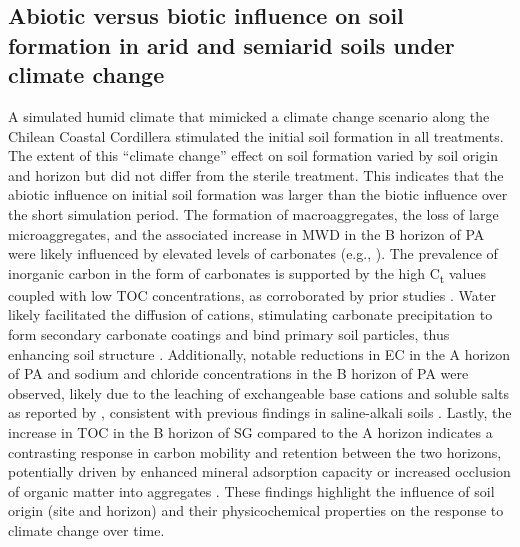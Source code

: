 \subsection{Abiotic versus biotic influence on soil formation in arid and semiarid soils under climate change}

A simulated humid climate that mimicked a climate change scenario along the Chilean Coastal Cordillera stimulated the initial soil formation in all treatments. The extent of this ``climate change'' effect on soil formation varied by soil origin and horizon but did not differ from the sterile treatment. This indicates that the abiotic influence on initial soil formation was larger than the biotic influence over the short simulation period. The formation of macroaggregates, the loss of large microaggregates, and the associated increase in MWD in the B horizon of PA were likely influenced by elevated levels of carbonates (e.g., ). The prevalence of inorganic carbon in the form of carbonates is supported by the high C\textsubscript{t} values coupled with low TOC concentrations, as corroborated by prior studies \citep{SchulzeMakuch2018, RiverasMunoz2022}. Water likely facilitated the diffusion of cations, stimulating carbonate precipitation to form secondary carbonate coatings and bind primary soil particles, thus enhancing soil structure \citep{Bronick2005}. Additionally, notable reductions in EC in the A horizon of PA and sodium and chloride concentrations in the B horizon of PA were observed, likely due to the leaching of exchangeable base cations and soluble salts as reported by \citet{Bernhard2018}, consistent with previous findings in saline-alkali soils \citep{Wang2017}. Lastly, the increase in TOC in the B horizon of SG compared to the A horizon indicates a contrasting response in carbon mobility and retention between the two horizons, potentially driven by enhanced mineral adsorption capacity or increased occlusion of organic matter into aggregates \citep{Kramer2018}. These findings highlight the influence of soil origin (site and horizon) and their physicochemical properties on the response to climate change over time.

